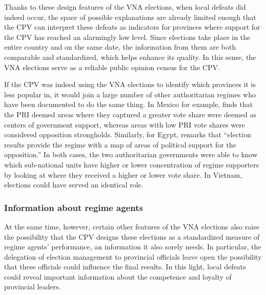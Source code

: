 \documentclass[12pt]{article}
\newcommand{\1}{\mathbbm{1}}
\begin{document}
Thanks to these design features of the VNA elections, when local defeats did indeed occur, the space of possible explanations are already limited enough that the CPV can interpret these defeats as indicators for provinces where support for the CPV has reached an alarmingly low level. Since elections take place in the entire country and on the same date, the information from them are both comparable and standardized, which helps enhance its quality. In this sense, the VNA elections serve as a reliable public opinion census for the CPV.

If the CPV was indeed using the VNA elections to identify which provinces it is less popular in, it would join a large number of other authoritarian regimes who have been documented to do the same thing. In Mexico for example, \cite{Magaloni2006} finds that the PRI deemed areas where they captured a greater vote share were deemed as centers of government support, whereas areas with low PRI vote shares were considered opposition strongholds. Similarly, for Egypt, \cite{Blaydes2008} remarks that ``election results provide the regime with a map of areas of political support for the opposition.'' In both cases, the two authoritarian governments were able to know which sub-national units have higher or lower concentration of regime supporters by looking at where they received a higher or lower vote share. In Vietnam, elections could have served an identical role.

\subsubsection{Information about regime agents}

At the same time, however, certain other features of the VNA elections also raise the possibility that the CPV designs these elections as a standardized measure of regime agents' performance, an information it also sorely needs. In particular, the delegation of election management to provincial officials leave open the possibility that these officials could influence the final results. In this light, local defeats could reveal important information about the competence and loyalty of provincial leaders. 
\end{document}
